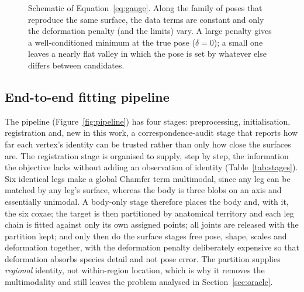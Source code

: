 \begin{figure}[!htb]
\centering
{}
\caption[Pose--deformation ambiguity]{Schematic of Equation~\eqref{eq:gauge}.
Along the family of poses that reproduce the same surface, the data terms are
constant and only the deformation penalty (and the limits) vary. A large penalty
gives a well-conditioned minimum at the true pose ($\delta=0$); a small one
leaves a nearly flat valley in which the pose is set by whatever else differs
between candidates.}
\label{fig:gauge}
\end{figure}

\subsection{End-to-end fitting pipeline}
\label{sec:pipeline}

The pipeline (Figure~\ref{fig:pipeline}) has four stages: preprocessing,
initialisation, registration and, new in this work, a correspondence-audit
stage that reports how far each vertex's identity can be trusted rather than
only how close the surfaces are. The registration stage is organised to supply,
step by step, the information the objective lacks without adding an observation
of identity (Table~\ref{tab:stages}). Six identical legs make a global Chamfer
term multimodal, since any leg can be matched by any leg's surface, whereas the
body is three blobs on an axis and essentially unimodal. A body-only stage
therefore places the body and, with it, the six coxae; the target is then
partitioned by anatomical territory and each leg chain is fitted against only
its own assigned points; all joints are released with the partition kept; and
only then do the surface stages free pose, shape, scales and deformation
together, with the deformation penalty deliberately expensive so that deformation
absorbs species detail and not pose error. The partition supplies \emph{regional}
identity, not within-region location, which is why it removes the multimodality
and still leaves the problem analysed in Section~\ref{sec:oracle}.




